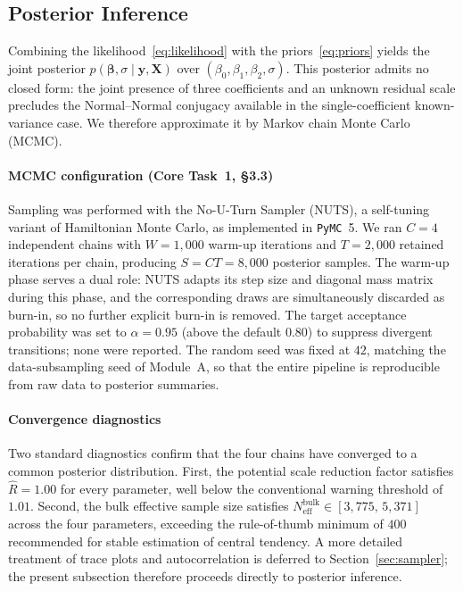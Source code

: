 \subsection{Posterior Inference}\label{sec:posterior}

Combining the likelihood~\eqref{eq:likelihood} with the priors~\eqref{eq:priors} yields the joint posterior $p(\boldsymbol{\beta},\sigma\mid\mathbf{y},\mathbf{X})$ over $(\beta_0,\beta_1,\beta_2,\sigma)$. This posterior admits no closed form: the joint presence of three coefficients and an unknown residual scale precludes the Normal--Normal conjugacy available in the single-coefficient known-variance case. We therefore approximate it by Markov chain Monte Carlo (MCMC).

\paragraph{MCMC configuration (Core Task~1, §3.3)}

Sampling was performed with the No-U-Turn Sampler (NUTS), a self-tuning variant of Hamiltonian Monte Carlo, as implemented in \texttt{PyMC}~5. We ran $C=4$ independent chains with $W=1{,}000$ warm-up iterations and $T=2{,}000$ retained iterations per chain, producing $S=CT=8{,}000$ posterior samples. The warm-up phase serves a dual role: NUTS adapts its step size and diagonal mass matrix during this phase, and the corresponding draws are simultaneously discarded as burn-in, so no further explicit burn-in is removed. The target acceptance probability was set to $\alpha=0.95$ (above the default $0.80$) to suppress divergent transitions; none were reported. The random seed was fixed at $42$, matching the data-subsampling seed of Module~A, so that the entire pipeline is reproducible from raw data to posterior summaries.

\paragraph{Convergence diagnostics}

Two standard diagnostics confirm that the four chains have converged to a common posterior distribution. First, the potential scale reduction factor satisfies $\hat{R}=1.00$ for every parameter, well below the conventional warning threshold of $1.01$. Second, the bulk effective sample size satisfies $N_{\text{eff}}^{\text{bulk}}\in[3{,}775,\,5{,}371]$ across the four parameters, exceeding the rule-of-thumb minimum of $400$ recommended for stable estimation of central tendency. A more detailed treatment of trace plots and autocorrelation is deferred to Section~\ref{sec:sampler}; the present subsection therefore proceeds directly to posterior inference.

